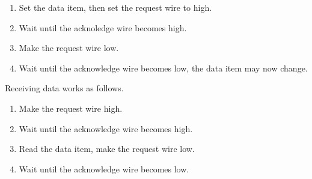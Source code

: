 \begin{enumerate}
	\item Set the data item, then set the request wire to high.
	\item Wait until the acknoledge wire becomes high.
	\item Make the request wire low.
	\item Wait until the acknowledge wire becomes low, the data item may now change.
\end{enumerate}

Receiving data works as follows.

\begin{enumerate}
	\item Make the request wire high.
	\item Wait until the acknowledge wire becomes high.
	\item Read the data item, make the request wire low.
	\item Wait until the acknowledge wire becomes low.
\end{enumerate}
